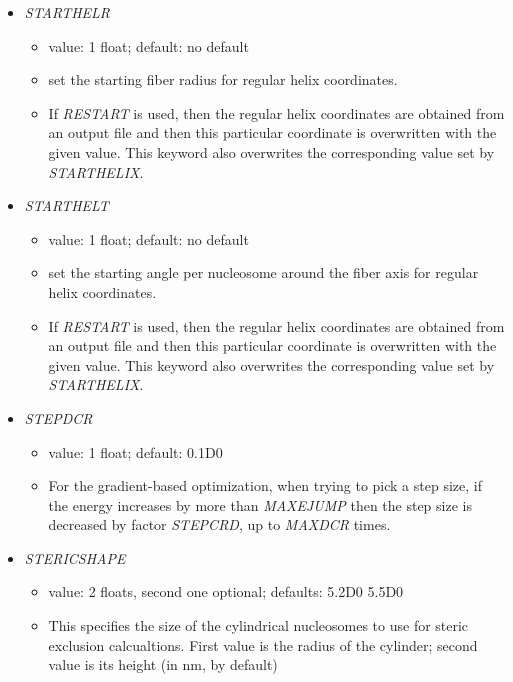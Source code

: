 \documentclass[12pt,dvips]{article}
\begin{document}
\begin{itemize}
\begin{itemize}
  \end{itemize}
%
\item {\it STARTHELR}
  \begin{itemize}
    \item value: 1 float; default: no default
    \item set the starting fiber radius for regular helix coordinates. 
    \item If {\it RESTART} is used, then the regular helix coordinates are obtained from an output file and then this particular coordinate is overwritten with the given value. This keyword also overwrites the corresponding value set by {\em STARTHELIX}.
  \end{itemize}
%
\item {\it STARTHELT}
  \begin{itemize}
    \item value: 1 float; default: no default
    \item set the starting angle per nucleosome around the fiber axis for regular helix coordinates.
    \item If {\it RESTART} is used, then the regular helix coordinates are obtained from an output file and then this particular coordinate is overwritten with the given value. This keyword also overwrites the corresponding value set by {\em STARTHELIX}.
  \end{itemize}
%
\item {\it STEPDCR}
  \begin{itemize}
    \item value: 1 float; default: 0.1D0
    \item For the gradient-based optimization, when trying to pick a step size, if the energy increases by more than {\em MAXEJUMP} then the step size is decreased by factor {\em STEPCRD}, up to {\em MAXDCR} times.
  \end{itemize}
%
\item {\it STERICSHAPE}
  \begin{itemize}
    \item value: 2 floats, second one optional; defaults: 5.2D0 5.5D0      
    \item This specifies the size of the cylindrical nucleosomes to use for steric exclusion calcualtions. First value is the radius of the cylinder; second value is its height (in nm, by default)
  \end{itemize}
%

\end{itemize}
\end{document}

